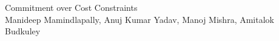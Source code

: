 \documentclass[11pt, a4paper]{article}
\begin{document}
\onehalfspacing

\begin{center}
{\LARGE Commitment over Cost Constraints}\\
{Manideep Mamindlapally, Anuj Kumar Yadav, Manoj Mishra, Amitalok Budkuley}\\
\end{center}
\vspace{1em}










\pagebreak


\end{document}
